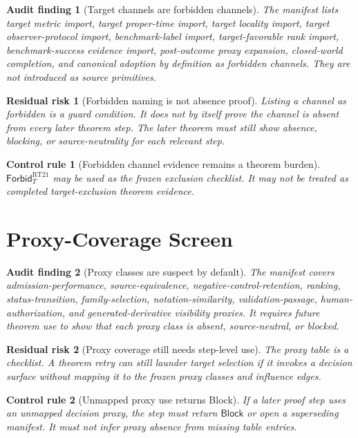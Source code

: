 \documentclass[11pt]{article}
\newcommand{\ForbidT}{\mathsf{Forbid}_{T}}
\newcommand{\Block}{\mathsf{Block}}
\newtheorem{auditfinding}{Audit finding}
\newtheorem{residualrisk}{Residual risk}
\newtheorem{controlrule}{Control rule}
\begin{document}
\begin{auditfinding}[Target channels are forbidden channels]
The manifest lists target metric import, target proper-time import, target
locality import, target observer-protocol import, benchmark-label import,
target-favorable rank import, benchmark-success evidence import,
post-outcome proxy expansion, closed-world completion, and canonical
adoption by definition as forbidden channels. They are not introduced as
source primitives.
\end{auditfinding}

\begin{residualrisk}[Forbidden naming is not absence proof]
Listing a channel as forbidden is a guard condition. It does not by itself
prove the channel is absent from every later theorem step. The later theorem
must still show absence, blocking, or source-neutrality for each relevant
step.
\end{residualrisk}

\begin{controlrule}[Forbidden channel evidence remains a theorem burden]
\(\ForbidT^{\mathrm{RT21}}\) may be used as the frozen exclusion checklist.
It may not be treated as completed target-exclusion theorem evidence.
\end{controlrule}

\section{Proxy-Coverage Screen}

\begin{auditfinding}[Proxy classes are suspect by default]
The manifest covers admission-performance, source-equivalence,
negative-control-retention, ranking, status-transition, family-selection,
notation-similarity, validation-passage, human-authorization, and
generated-derivative visibility proxies. It requires future theorem use to
show that each proxy class is absent, source-neutral, or blocked.
\end{auditfinding}

\begin{residualrisk}[Proxy coverage still needs step-level use]
The proxy table is a checklist. A theorem retry can still launder target
selection if it invokes a decision surface without mapping it to the frozen
proxy classes and influence edges.
\end{residualrisk}

\begin{controlrule}[Unmapped proxy use returns Block]
If a later proof step uses an unmapped decision proxy, the step must return
\(\Block\) or open a superseding manifest. It must not infer proxy absence
from missing table entries.
\end{controlrule}
\end{document}
